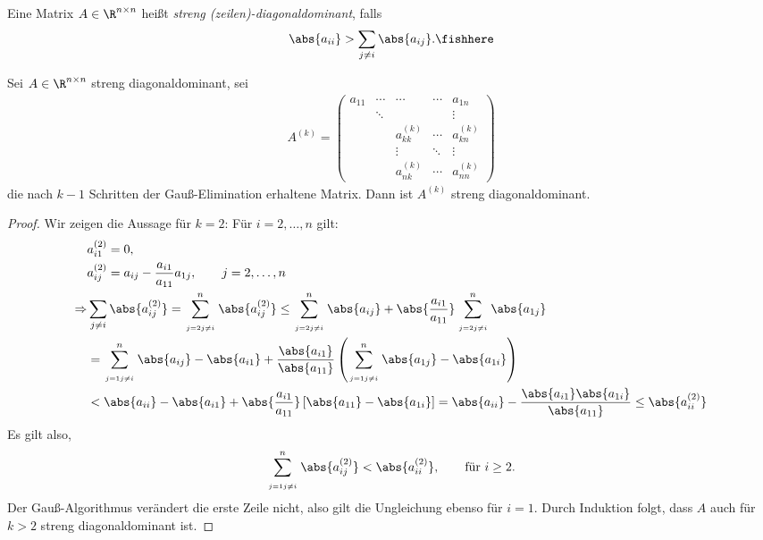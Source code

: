 \begin{defn}
Eine Matrix $A\in\R^{n\times n}$ heißt \emph{streng
(zeilen)-diagonaldominant}, falls
\begin{align*}
\abs{a_{ii}} > \sum\limits_{j\neq i} \abs{a_{ij}}.\fishhere
\end{align*}
\end{defn}

\begin{prop}
\label{prop:2.4}
Sei $A\in\R^{n\times n}$ streng diagonaldominant, sei
\begin{align*}
A^{(k)}
= \begin{pmatrix}
  a_{11} & \cdots & \cdots & \cdots & a_{1n}\\
   & \ddots & & & \vdots \\
   & & a_{kk}^{(k)} & \cdots & a_{kn}^{(k)}\\
   & & \vdots & \ddots & \vdots \\
   & & a_{nk}^{(k)} & \cdots & a_{nn}^{(k)}
  \end{pmatrix}
\end{align*}
die nach $k-1$ Schritten der Gauß-Elimination erhaltene Matrix. Dann ist
$A^{(k)}$ streng diagonaldominant.\fishhere
\end{prop}
\begin{proof}
Wir zeigen die Aussage für $k=2$:
Für $i=2,\ldots,n$ gilt:
\begin{align*}
&a_{i1}^{(2)}  = 0,\\
&a_{ij}^{(2)}  = a_{ij}-\frac{a_{i1}}{a_{11}}a_{1j},\qquad j=2,\ldots,n\\
\Rightarrow & \sum\limits_{j\neq i} \abs{a_{ij}^{(2)}} =
\sum\limits_{\atop{j=2}{j\neq i}}^n \abs{a_{ij}^{(2)}} \le
\sum\limits_{\atop{j=2}{j\neq i}}^n
\abs{a_{ij}}+\abs{\frac{a_{i1}}{a_{11}}}\sum\limits_{\atop{j=2}{j\neq i}}^n
\abs{a_{1j}}
\\ &= \sum\limits_{\atop{j=1}{j\neq i}}^n
\abs{a_{ij}}-\abs{a_{i1}}+\frac{\abs{a_{i1}}}{\abs{a_{11}}}
\left(\sum\limits_{\atop{j=1}{j\neq i}}^n
\abs{a_{1j}} -
\abs{a_{1i}}\right) \\ &< \abs{a_{ii}}-\abs{a_{i1}} +
\abs{\frac{a_{i1}}{a_{11}}}\left[\abs{a_{11}} - \abs{a_{1i}}\right]
=  \abs{a_{ii}} - \frac{\abs{a_{i1}}\abs{a_{1i}}}{\abs{a_{11}}}
\le \abs{a_{ii}^{(2)}} 
\end{align*}
Es gilt also,
\begin{align*}
\sum\limits_{\atop{j=1}{j\neq i}}^n \abs{a_{ij}^{(2)}} <
\abs{a_{ii}^{(2)}},\qquad \text{für } i\ge 2.
\end{align*}
Der Gauß-Algorithmus verändert die erste Zeile nicht, also gilt die Ungleichung
ebenso für $i=1$. Durch Induktion folgt, dass $A$ auch für $k>2$ streng
diagonaldominant ist.\qedhere
\end{proof}

